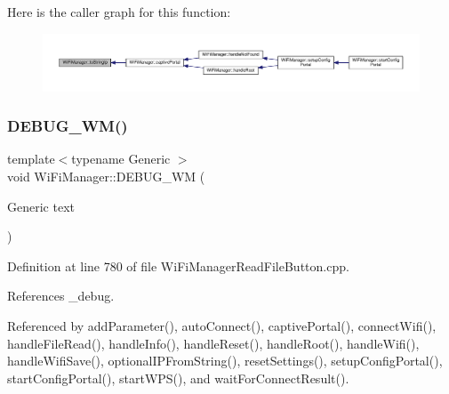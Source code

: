 Here is the caller graph for this function\+:\nopagebreak
\begin{figure}[H]
\begin{center}
\leavevmode
\includegraphics[width=350pt]{d4/dc8/class_wi_fi_manager_a8dfd64cefecbdf26242b16eca335c20b_icgraph}
\end{center}
\end{figure}
\mbox{\label{class_wi_fi_manager_ae5f595c670ccbcf9a191baf50f5c7c26}} 
\subsubsection{\texorpdfstring{D\+E\+B\+U\+G\+\_\+\+W\+M()}{DEBUG\_WM()}}
{\footnotesize\ttfamily template$<$typename Generic $>$ \\
void Wi\+Fi\+Manager\+::\+D\+E\+B\+U\+G\+\_\+\+WM (\begin{DoxyParamCaption}\item[{Generic}]{text }\end{DoxyParamCaption})\hspace{0.3cm}{\ttfamily [private]}}



Definition at line 780 of file Wi\+Fi\+Manager\+Read\+File\+Button.\+cpp.



References \+\_\+debug.



Referenced by add\+Parameter(), auto\+Connect(), captive\+Portal(), connect\+Wifi(), handle\+File\+Read(), handle\+Info(), handle\+Reset(), handle\+Root(), handle\+Wifi(), handle\+Wifi\+Save(), optional\+I\+P\+From\+String(), reset\+Settings(), setup\+Config\+Portal(), start\+Config\+Portal(), start\+W\+P\+S(), and wait\+For\+Connect\+Result().

